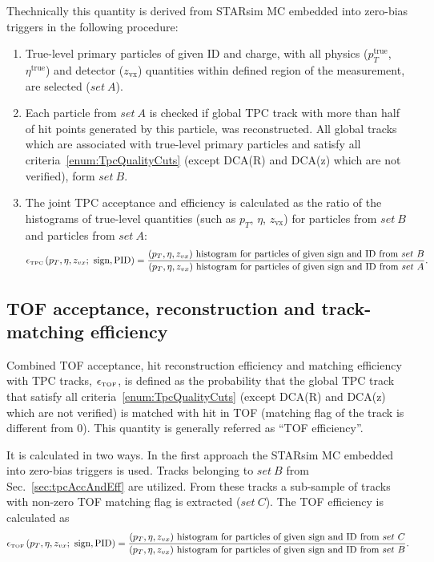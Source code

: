 Thechnically this quantity is derived from STARsim MC embedded into zero-bias triggers in the following procedure:
\begin{enumerate}
	\item True-level primary particles of given ID and charge, with all physics ($p_{T}^{\textrm{true}}$, $\eta^{\textrm{true}}$) and detector ($z_{\textrm{vx}}$) quantities within defined region of the measurement, are selected ($set~A$).
	\item Each particle from $set~A$ is checked if global TPC track with more than half of hit points generated by this particle, was reconstructed. All global tracks which are associated with true-level primary particles and satisfy all criteria~\ref{enum:TpcQualityCuts} (except DCA(R) and DCA(z) which are not verified), form $set~B$.
	\item The joint TPC acceptance and efficiency is calculated as the ratio of the histograms of true-level quantities (such as $p_{T}$, $\eta$, $z_{\textrm{vx}}$) for particles from $set~B$ and particles from $set~A$:
	\begin{equation}\label{eq:tpcAccAndEffDefinition}
		\epsilon_{\textrm{\tiny TPC}}\left(p_{T}, \eta, z_{vx};~\textrm{sign},\textrm{PID}\right) = \frac{(p_{T},\eta, z_{vx})~\textrm{histogram for particles of given sign and ID from}~set~B}{(p_{T},\eta, z_{vx})~\textrm{histogram for particles of given sign and ID from}~set~A}.
	\end{equation}

\end{enumerate}

\subsection{TOF acceptance, reconstruction and track-matching efficiency}\label{sec:tofAccAndEff}

Combined TOF acceptance, hit reconstruction efficiency and matching efficiency with TPC tracks, $\epsilon_{\textrm{\tiny TOF}}$, is defined as the probability that the global TPC track that satisfy all criteria~\ref{enum:TpcQualityCuts} (except DCA(R) and DCA(z) which are not verified) is matched with hit in TOF (matching flag of the track is different from 0). This quantity is generally referred as ``TOF efficiency''.

It is calculated in two ways. In the first approach the STARsim MC embedded into zero-bias triggers is used. Tracks belonging to $set~B$ from Sec.~\ref{sec:tpcAccAndEff} are utilized. From these tracks a sub-sample of tracks with non-zero TOF matching flag is extracted ($set~C$). The TOF efficiency is calculated as
\begin{equation}\label{eq:tofAccAndEffDefinition}
		\epsilon_{\textrm{\tiny TOF}}\left(p_{T}, \eta, z_{vx};~\textrm{sign},\textrm{PID}\right) = \frac{(p_{T},\eta, z_{vx})~\textrm{histogram for particles of given sign and ID from}~set~C}{(p_{T},\eta, z_{vx})~\textrm{histogram for particles of given sign and ID from}~set~B}.
	\end{equation}

